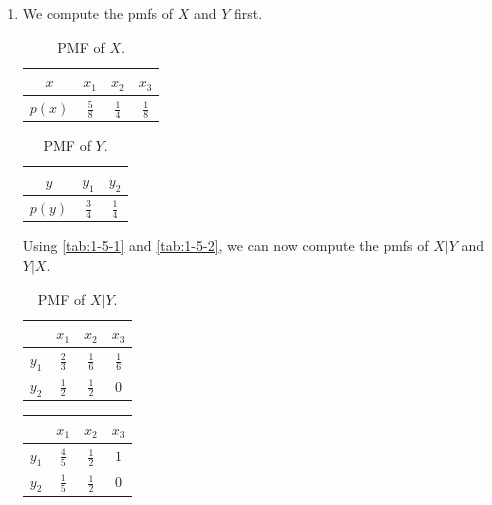 \documentclass[journal,12pt,twocolumn]{IEEEtran}
\renewcommand\thesection{\arabic{section}}
\begin{document}
\begin{enumerate}[label=\thesection.\arabic*, ref=\thesection.\theenumi]
    \item We compute the pmfs of $X$ and $Y$ first.
    \begin{table}[!htb]
        \centering
        \begin{tabular}{|c|c|c|c|}
            \hline
            $x$ & $x_1$ & $x_2$ & $x_3$ \\
            \hline
            $p(x)$ & $\frac{5}{8}$ & $\frac{1}{4}$ & $\frac{1}{8}$ \\ 
            \hline
        \end{tabular}
        \caption{PMF of $X$.}
        \label{tab:1-5-1}
    \end{table}
    \begin{table}[!htb]
        \centering
        \begin{tabular}{|c|c|c|}
            \hline
            $y$ & $y_1$ & $y_2$ \\
            \hline
            $p(y)$ & $\frac{3}{4}$ & $\frac{1}{4}$ \\ 
            \hline
        \end{tabular}
        \caption{PMF of $Y$.}
        \label{tab:1-5-2}
    \end{table}
    Using \autoref{tab:1-5-1} and \autoref{tab:1-5-2}, we can now compute the 
    pmfs of $X|Y$ and $Y|X$.
    \begin{table}[!htb]
        \centering
        \begin{tabular}{|c|c|c|c|}
            \hline
            & $x_1$ & $x_2$ & $x_3$ \\
            \hline
            $y_1$ & $\frac{2}{3}$ & $\frac{1}{6}$ & $\frac{1}{6}$ \\ 
            \hline
            $y_2$ & $\frac{1}{2}$ & $\frac{1}{2}$ & $0$ \\
            \hline
        \end{tabular}
        \caption{PMF of $X|Y$.}
        \label{tab:1-5-3}
    \end{table}
    \begin{table}[!htb]
        \centering
        \begin{tabular}{|c|c|c|c|}
            \hline
            & $x_1$ & $x_2$ & $x_3$ \\
            \hline
            $y_1$ & $\frac{4}{5}$ & $\frac{1}{2}$ & $1$ \\ 
            \hline
            $y_2$ & $\frac{1}{5}$ & $\frac{1}{2}$ & $0$ \\
            \hline
        \end{tabular}

\end{table}
\end{enumerate}
\end{document}

